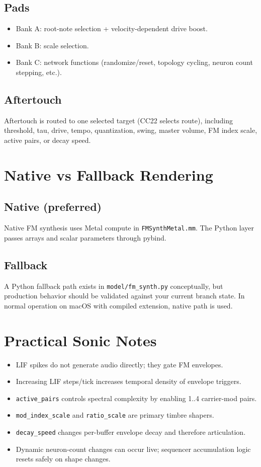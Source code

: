 \documentclass[11pt,a4paper]{article}
\begin{document}
\subsection{Pads}
\begin{itemize}
    \item Bank A: root-note selection + velocity-dependent drive boost.
    \item Bank B: scale selection.
    \item Bank C: network functions (randomize/reset, topology cycling, neuron count stepping, etc.).
\end{itemize}

\subsection{Aftertouch}
Aftertouch is routed to one selected target (CC22 selects route), including threshold, tau, drive, tempo, quantization, swing, master volume, FM index scale, active pairs, or decay speed.

\section{Native vs Fallback Rendering}
\subsection{Native (preferred)}
Native FM synthesis uses Metal compute in \texttt{FMSynthMetal.mm}. The Python layer passes arrays and scalar parameters through pybind.

\subsection{Fallback}
A Python fallback path exists in \texttt{model/fm\_synth.py} conceptually, but production behavior should be validated against your current branch state. In normal operation on macOS with compiled extension, native path is used.

\section{Practical Sonic Notes}
\begin{itemize}
    \item LIF spikes do not generate audio directly; they gate FM envelopes.
    \item Increasing LIF steps/tick increases temporal density of envelope triggers.
    \item \texttt{active\_pairs} controls spectral complexity by enabling 1..4 carrier-mod pairs.
    \item \texttt{mod\_index\_scale} and \texttt{ratio\_scale} are primary timbre shapers.
    \item \texttt{decay\_speed} changes per-buffer envelope decay and therefore articulation.
    \item Dynamic neuron-count changes can occur live; sequencer accumulation logic resets safely on shape changes.
\end{itemize}
\end{document}
